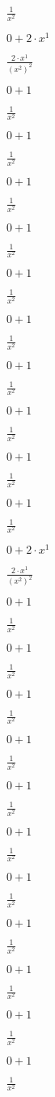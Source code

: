 $ \frac{1}{x^{2}} $

$0+2 \cdot x^{1}$

$ \frac{2 \cdot x^{1}}{(x^{2})^{2}} $

$0+1$

$ \frac{1}{x^{2}} $

$0+1$

$ \frac{1}{x^{2}} $

$0+1$

$ \frac{1}{x^{2}} $

$0+1$

$ \frac{1}{x^{2}} $

$0+1$

$ \frac{1}{x^{2}} $

$0+1$

$ \frac{1}{x^{2}} $

$0+1$

$ \frac{1}{x^{2}} $

$0+1$

$ \frac{1}{x^{2}} $

$0+1$

$ \frac{1}{x^{2}} $

$0+1$

$ \frac{1}{x^{2}} $

$0+2 \cdot x^{1}$

$ \frac{2 \cdot x^{1}}{(x^{2})^{2}} $

$0+1$

$ \frac{1}{x^{2}} $

$0+1$

$ \frac{1}{x^{2}} $

$0+1$

$ \frac{1}{x^{2}} $

$0+1$

$ \frac{1}{x^{2}} $

$0+1$

$ \frac{1}{x^{2}} $

$0+1$

$ \frac{1}{x^{2}} $

$0+1$

$ \frac{1}{x^{2}} $

$0+1$

$ \frac{1}{x^{2}} $

$0+1$

$ \frac{1}{x^{2}} $

$0+1$

$ \frac{1}{x^{2}} $

$0+1$

$ \frac{1}{x^{2}} $


